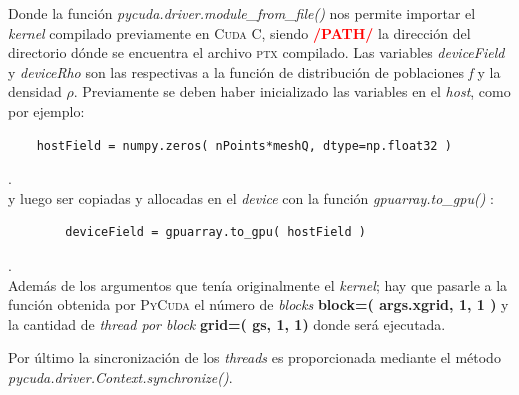 Donde la función \textit{pycuda.driver.module\_from\_file()} nos permite importar el \textit{kernel} compilado previamente en \textsc{Cuda C}, siendo \textcolor{red}{\textbf{/PATH/}} la dirección del directorio dónde se encuentra el archivo \textsc{ptx} compilado. Las variables \textit{deviceField} y \textit{deviceRho} son las respectivas a la función de distribución de poblaciones \textit{f} y la densidad $\rho$. Previamente se deben haber inicializado las variables en el \textit{host}, como por ejemplo:
{\footnotesize
	\begin{frame}{}
		\begin{lstlisting}
	hostField = numpy.zeros( nPoints*meshQ, dtype=np.float32 ) 
		\end{lstlisting}
		
	\end{frame}
}.
\\
y luego ser copiadas y allocadas en el  \textit{device} con la función \textit{gpuarray.to\_gpu()} :
{\footnotesize
	\begin{frame}{}
		\begin{lstlisting}
		deviceField = gpuarray.to_gpu( hostField )
		\end{lstlisting}
		
	\end{frame}
}.
\\
Además de los argumentos que tenía originalmente el \textit{kernel}; hay que pasarle a la función obtenida por \textsc{PyCuda} el número de \textit{blocks} \textbf{block=( args.xgrid, 1, 1 )} y la cantidad de \textit{thread por block} \textbf{grid=( gs, 1, 1)} donde será ejecutada. 

Por último la sincronización de los \textit{threads} es proporcionada mediante el método \\
\textit{pycuda.driver.Context.synchronize()}.

